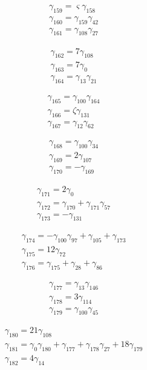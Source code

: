 \[\begin{aligned}\gamma_{159}=\varsigma  \gamma_{158}\\ \gamma_{160}=\gamma_{159} \gamma_{42}\\ \gamma_{161}=\gamma_{108} \gamma_{27}\end{aligned}\]

\[\begin{aligned}\gamma_{162}=7 \gamma_{108}\\ \gamma_{163}=7 \gamma_{0}\\ \gamma_{164}=\gamma_{13} \gamma_{21}\end{aligned}\]

\[\begin{aligned}\gamma_{165}=\gamma_{100} \gamma_{164}\\ \gamma_{166}=\zeta  \gamma_{131}\\ \gamma_{167}=\gamma_{12} \gamma_{62}\end{aligned}\]

\[\begin{aligned}\gamma_{168}=\gamma_{100} \gamma_{34}\\ \gamma_{169}=2 \gamma_{107}\\ \gamma_{170}=- \gamma_{169}\end{aligned}\]

\[\begin{aligned}\gamma_{171}=2 \gamma_{0}\\ \gamma_{172}=\gamma_{170} + \gamma_{171} \gamma_{57}\\ \gamma_{173}=- \gamma_{131}\end{aligned}\]

\[\begin{aligned}\gamma_{174}=- \gamma_{100} \gamma_{97} + \gamma_{105} + \gamma_{173}\\ \gamma_{175}=12 \gamma_{72}\\ \gamma_{176}=\gamma_{175} + \gamma_{28} + \gamma_{86}\end{aligned}\]

\[\begin{aligned}\gamma_{177}=\gamma_{13} \gamma_{146}\\ \gamma_{178}=3 \gamma_{114}\\ \gamma_{179}=\gamma_{100} \gamma_{45}\end{aligned}\]

\[\begin{aligned}\gamma_{180}=21 \gamma_{108}\\ \gamma_{181}=\gamma_{0} \gamma_{180} + \gamma_{177} + \gamma_{178} \gamma_{27} + 18 \gamma_{179}\\ \gamma_{182}=4 \gamma_{14}\end{aligned}\]

